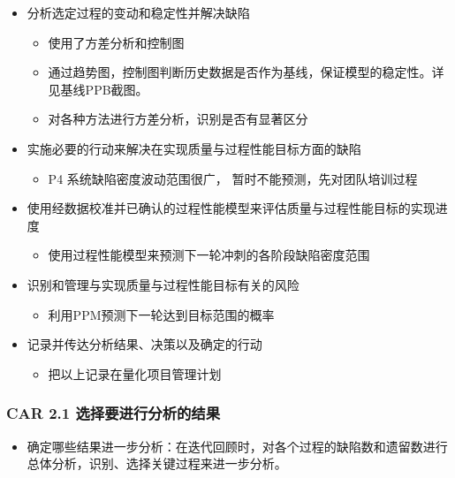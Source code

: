 \begin{itemize}
\tightlist
\item
  分析选定过程的变动和稳定性并解决缺陷

  \begin{itemize}
  \tightlist
  \item
    使用了方差分析和控制图
  \item
    通过趋势图，控制图判断历史数据是否作为基线，保证模型的稳定性。详见基线PPB截图。
  \item
    对各种方法进行方差分析，识别是否有显著区分
  \end{itemize}
\item
  实施必要的行动来解决在实现质量与过程性能目标方面的缺陷

  \begin{itemize}
  \tightlist
  \item
    P4 系统缺陷密度波动范围很广， 暂时不能预测，先对团队培训过程
  \end{itemize}
\item
  使用经数据校准并已确认的过程性能模型来评估质量与过程性能目标的实现进度

  \begin{itemize}
  \tightlist
  \item
    使用过程性能模型来预测下一轮冲刺的各阶段缺陷密度范围
  \end{itemize}
\item
  识别和管理与实现质量与过程性能目标有关的风险

  \begin{itemize}
  \tightlist
  \item
    利用PPM预测下一轮达到目标范围的概率
  \end{itemize}
\item
  记录并传达分析结果、决策以及确定的行动

  \begin{itemize}
  \tightlist
  \item
    把以上记录在量化项目管理计划
  \end{itemize}
\end{itemize}

\hypertarget{car-2.1-ux9009ux62e9ux8981ux8fdbux884cux5206ux6790ux7684ux7ed3ux679c}{%
\subsubsection{CAR 2.1
选择要进行分析的结果}\label{car-2.1-ux9009ux62e9ux8981ux8fdbux884cux5206ux6790ux7684ux7ed3ux679c}}

\begin{itemize}
\tightlist
\item
  确定哪些结果进一步分析：在迭代回顾时，对各个过程的缺陷数和遗留数进行总体分析，识别、选择关键过程来进一步分析。
\end{itemize}

